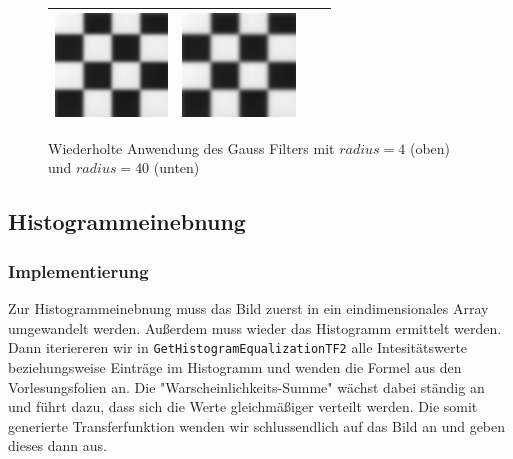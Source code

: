 \documentclass[12pt,german]{article}
\begin{document}
\begin{figure} [H]
\begin{tabular}{| c | c | c | c |}
	\includegraphics[width=3cm]{../testData/Gauss/SchachbrettR40S4v3.jpg} & 	
	\includegraphics[width=3cm]{../testData/Gauss/SchachbrettR40S4v4.jpg} \\
	\hline
  \end{tabular}
  \caption{Wiederholte Anwendung des Gauss Filters mit $ radius = 4 $ (oben) und $radius = 40 $ (unten)}
  \label{tab:wiederholterGauss}
\end{figure}

\newpage
\subsection{Histogrammeinebnung }

\subsubsection{Implementierung}
Zur Histogrammeinebnung muss das Bild zuerst in ein eindimensionales Array umgewandelt werden. Außerdem muss wieder das Histogramm ermittelt werden. Dann iteriereren wir in \texttt{GetHistogramEqualizationTF2} alle Intesitätswerte beziehungsweise Einträge im Histogramm und wenden die Formel aus den Vorlesungsfolien an. Die "Warscheinlichkeits-Summe" wächst dabei ständig an und führt dazu, dass sich die Werte gleichmäßiger verteilt werden. Die somit generierte Transferfunktion wenden wir schlussendlich auf das Bild an und geben dieses dann aus.

\end{document}
